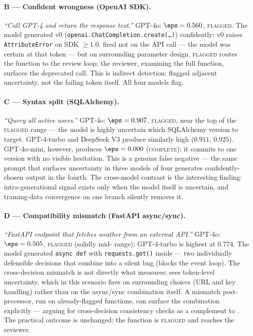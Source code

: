 \paragraph{B --- Confident wrongness (OpenAI SDK).}
\textit{``Call GPT-4 and return the response text.''} GPT-4o: $\eps
= 0.560$, \textsc{flagged}. The model generated v0
(\texttt{openai.ChatCompletion.create(\ldots)}) confidently; v0
raises \texttt{AttributeError} on SDK $\ge 1.0$. \eps fired not on
the API call --- the model was certain at that token --- but on
surrounding parameter design. \textsc{flagged} routes the function
to the review loop; the reviewer, examining the full function,
surfaces the deprecated call. This is indirect detection: \eps
flagged adjacent uncertainty, not the failing token itself. All
four models flag.

\paragraph{C --- Syntax split (SQLAlchemy).}
\textit{``Query all active users.''} GPT-4o: $\eps = 0.907$,
\textsc{flagged}, near the top of the \textsc{flagged} range ---
the model is highly uncertain which SQLAlchemy version to target.
GPT-4-turbo and DeepSeek V3 produce similarly high \eps ($0.911$,
$0.925$). GPT-4o-mini, however, produces $\eps = 0.000$
(\textsc{complete}): it commits to one version with no visible
hesitation. This is a genuine false negative --- the same prompt
that surfaces uncertainty in three models of four generates
confidently-chosen output in the fourth. The cross-model contrast
is the interesting finding: intra-generational signal exists only
when the model itself is uncertain, and training-data convergence
on one branch silently removes it.

\paragraph{D --- Compatibility mismatch (FastAPI async/sync).}
\textit{``FastAPI endpoint that fetches weather from an external
API.''} GPT-4o: $\eps = 0.505$, \textsc{flagged} (solidly mid-%
range); GPT-4-turbo is highest at $0.774$. The model generated
\texttt{async def} with \texttt{requests.get()} inside --- two
individually defensible decisions that combine into a silent bug
(blocks the event loop). The cross-decision mismatch is not
directly what \eps measures: \eps sees token-level uncertainty,
which in this scenario fires on surrounding choices (URL and key
handling) rather than on the async/sync combination itself. A
mismatch post-processor, run on already-flagged functions, can
surface the combination explicitly --- arguing for cross-decision
consistency checks as a complement to \eps. The practical outcome
is unchanged: the function is \textsc{flagged} and reaches the
reviewer.

